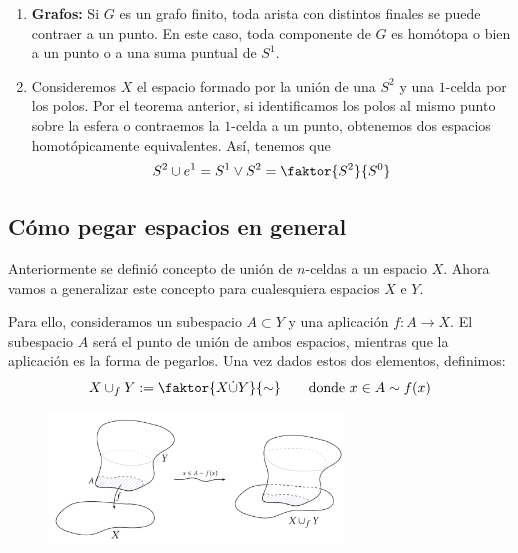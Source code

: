 \begin{ejems}
\begin{enumerate}
\item \textbf{Grafos:} 
Si $G$ es un grafo finito, toda arista con distintos finales se puede contraer a un punto. En este caso, toda componente de $G$ es homótopa o bien a un punto o a una suma puntual de $S^1$.

\item Consideremos $X$ el espacio formado por la unión de una $S^2$ y una $1$-celda por los polos. Por el teorema anterior, si identificamos los polos al mismo punto sobre la esfera o contraemos la $1$-celda a un punto, obtenemos dos espacios homotópicamente equivalentes. Así, tenemos que
\[ S^2 \cup e^1 = S^1 \vee S^2 = \faktor{S^2}{S^0} \]

\end{enumerate}
\end{ejems}

\subsection{Cómo pegar espacios en general}
Anteriormente se definió concepto de unión de $n$-celdas a un espacio $X$. Ahora vamos a generalizar este concepto para cualesquiera espacios $X$ e $Y$. \par 
Para ello, consideramos un subespacio $A \subset Y $ y una aplicación $f : A \longrightarrow X$. El subespacio $A$ será el punto de unión de ambos espacios, mientras que la aplicación es la forma de pegarlos. Una vez dados estos dos elementos, definimos:
\[ X \cup_f Y := \faktor{X \dot{\cup} Y}{\sim} \qquad \text{donde }x \in A \sim f(x) \]
\begin{figure}[h]
\centering
\includegraphics[width = 0.7\textwidth]{images/pegadoespacios}
\end{figure}

